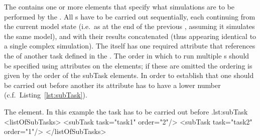The  contains one or more  elements that specify what simulations are to be performed by the .
All s have to be carried out sequentially, each continuing from the current model state (i.e.\ as at the end of the previous , assuming it simulates the same model), and with their results concatenated (thus appearing identical to a single complex simulation).
The  itself has one required attribute  that references the  of another task defined in the .
The order in which to run multiple s should be specified using  attributes on the  elements; if these are omitted the ordering is given by the order of the subTask elements.
In order to establish that one  should be carried out before another its  attribute has to have a lower number (c.f.\ Listing~\ref{lst:subTask}).

\begin{myXmlLst}{The  element. In this example the task  has to be carried out before .}{lst:subTask}
  <listOfSubTasks>
    <subTask task="task1" order="2"/> 
    <subTask task="task2" order="1"/> 
  </listOfSubTasks>
\end{myXmlLst}

 


